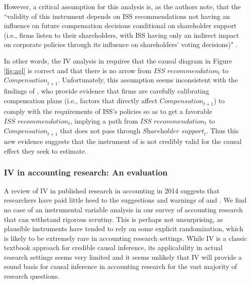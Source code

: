 \documentclass[11pt,reqno,titlepage]{amsart}
\begin{document}
\begin{doublespace}
However, a critical assumption for this analysis is, as the authors note, that the ``validity of this instrument depends on ISS recommendations not having an influence on future compensation decisions conditional on shareholder support (i.e., firms listen to their shareholders, with ISS having only an indirect impact on corporate policies through its influence on shareholders' voting decisions)" \citep[p.\,912]{Armstrong:2013io}.

In other words, the IV analysis in \citet[p.\,912]{Armstrong:2013io} requires that the causal diagram in Figure \ref{fig:agl} is correct and that there is no arrow from $\textit{ISS recommendation}_t$ to $\textit{Compensation}_{t+1}$. 
Unfortunately, this assumption seems inconsistent with the findings of \citet{Gow:2013aa}, who provide evidence that firms are carefully calibrating compensation plans (i.e., factors that directly affect $\textit{Compensation}_{t+1}$) to comply with the requirements of ISS's policies so as to get a favorable $\textit{ISS recommendation}_t$, implying a path from $\textit{ISS recommendation}_t$ to $\textit{Compensation}_{t+1}$ that does not pass through $\textit{Shareholder support}_{t}$.
Thus this new evidence suggests that the instrument of \citet[p.\,912]{Armstrong:2013io} is not credibly valid for the causal effect they seek to estimate.

\subsubsection{IV in accounting research: An evaluation}
A review of IV in published research in accounting in 2014 suggests that researchers have paid little heed to the suggestions and warnings of  \citet{Larcker:2010fq} and \citet{Roberts:2013cz}.
We find no case of an instrumental variable analysis in our survey of accounting research that can withstand rigorous scrutiny.
This is perhaps not unsurprising, as plausible instruments have tended to rely on some explicit randomization, which is likely to be extremely rare in accounting research settings.
While IV is a classic textbook approach for credible causal inference, its applicability in actual research settings seems very limited and it seems unlikely that IV will provide a sound basis for causal inference in accounting research for the vast majority of research questions.
 

\end{doublespace}
\end{document}
